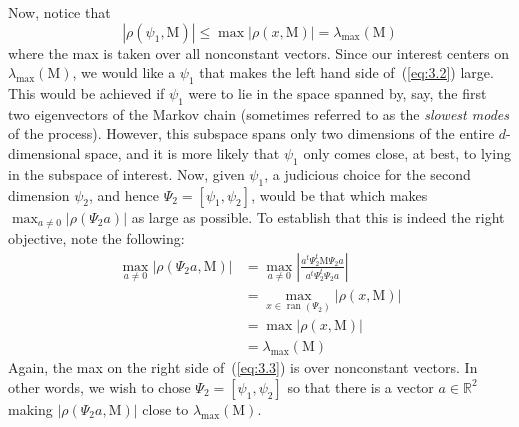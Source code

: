 \documentclass[12pt,letterpaper]{report}
\theoremstyle{plain}
\theoremstyle{definition}
\theoremstyle{remark}
\numberwithin{theorem}{chapter}
\numberwithin{claim}{chapter}
\numberwithin{equation}{chapter}
\numberwithin{conjecture}{chapter}
\newcommand\R{\ensuremath{\mathbb{R}}}
\newcommand\M{\ensuremath{\mathrm{M}}}
\newcommand\ran{\ensuremath{\operatorname{ran}}}
\newcommand\<{\ensuremath{\langle}}
\renewcommand\>{\ensuremath{\rangle}}
\newcommand\lambdamax{\ensuremath{\lambda_{\max}(\M)}}
\begin{document}
Now, notice that
\begin{equation}
  \label{eq:3.2}
|\rho(\psi_1,\M)| \leq \max |\rho(x,\M)| = \lambda_{\max}(\M)
\end{equation}
where the max is taken over all nonconstant vectors. Since our interest 
centers on 
$\lambda_{\max}(\M)$, 
we would like a $\psi_1$ that makes the left hand side of~(\ref{eq:3.2}) large. 
This would be achieved if $\psi_1$ were to lie in the space spanned by, say, the
first two eigenvectors of the Markov chain (sometimes referred 
to as the \emph{slowest modes} of the process). However, this subspace spans
only two dimensions of the entire $d$-dimensional space, and it is more likely
that $\psi_1$ only comes close, at best, to lying in the subspace of
interest. Now, given $\psi_1$, a judicious choice for the second dimension $\psi_2$, and
hence $\Psi_2 = [\psi_1, \psi_2]$, would be that which makes 
$\max_{a\neq 0} |\rho(\Psi_2 a)|$ as large as possible. To establish that 
this is indeed the right objective, note the following:
\begin{align}
\label{eq:3.3}
\max_{a\neq 0}|\rho(\Psi_2a,\M)| &= \max_{a\neq 0} \left|\frac{a^t \Psi^t_2 \M \Psi_2 a}{a^t \Psi^t_2 \Psi_2 a}\right|\nonumber\\
&= \max_{x\in \ran(\Psi_2)}|\rho(x,\M)|\nonumber\\
&= \max|\rho(x,\M)|\\
&= \lambdamax\nonumber
\end{align}
Again, the max on the right side of~(\ref{eq:3.3}) is over nonconstant vectors. 
In other words, we wish to chose
$\Psi_2 = [\psi_1, \psi_2]$ so that there is a vector $a \in \R^2$ making 
$|\rho(\Psi_2 a,\M)|$ close to $\lambdamax$.
\end{document}
